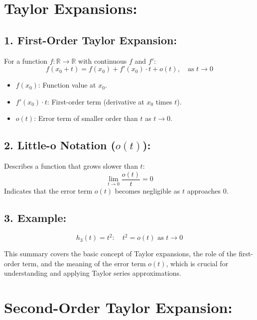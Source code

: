 \documentclass{article}
\begin{document}
\section*{Taylor Expansions:}

\subsection*{1. First-Order Taylor Expansion:}
For a function $f : \mathbb{R} \to \mathbb{R}$ with continuous $f$ and $f'$:
\[
f(x_0 + t) = f(x_0) + f'(x_0) \cdot t + o(t), \quad \text{as } t \to 0
\]
\begin{itemize}
    \item $f(x_0)$: Function value at $x_0$.
    \item $f'(x_0) \cdot t$: First-order term (derivative at $x_0$ times $t$).
    \item $o(t)$: Error term of smaller order than $t$ as $t \to 0$.
\end{itemize}

\subsection*{2. Little-o Notation ($o(t)$):}
Describes a function that grows slower than $t$:
\[
\lim_{t \to 0} \frac{o(t)}{t} = 0
\]
Indicates that the error term $o(t)$ becomes negligible as $t$ approaches 0.

\subsection*{3. Example:}
\[
h_3(t) = t^2: \quad t^2 = o(t) \text{ as } t \to 0
\]

This summary covers the basic concept of Taylor expansions, the role of the first-order term, and the meaning of the error term $o(t)$, which is crucial for understanding and applying Taylor series approximations.


\section*{Second-Order Taylor Expansion:}
\end{document}
